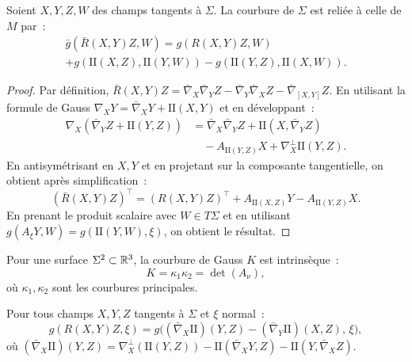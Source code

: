 \begin{theoreme}
\label{thm:gauss}
Soient $X, Y, Z, W$ des champs tangents \`a $\Sigma$. La courbure de $\Sigma$ est
reli\'ee \`a celle de $M$ par~:
\begin{multline*}
    \bar{g}(\bar{R}(X, Y)Z, W) = g(R(X, Y)Z, W) \\
    + g(\mathrm{I\!I}(X, Z), \mathrm{I\!I}(Y, W))
    - g(\mathrm{I\!I}(Y, Z), \mathrm{I\!I}(X, W)).
\end{multline*}
\end{theoreme}

\begin{proof}
Par d\'efinition, $\bar{R}(X,Y)Z = \bar{\nabla}_X \bar{\nabla}_Y Z
- \bar{\nabla}_Y \bar{\nabla}_X Z - \bar{\nabla}_{[X,Y]} Z$. En utilisant la
formule de Gauss $\nabla_X Y = \bar{\nabla}_X Y + \mathrm{I\!I}(X, Y)$ et en
d\'eveloppant~:
\begin{align*}
    \nabla_X(\bar{\nabla}_Y Z + \mathrm{I\!I}(Y,Z))
    &= \bar{\nabla}_X \bar{\nabla}_Y Z + \mathrm{I\!I}(X, \bar{\nabla}_Y Z) \\
    &\quad - A_{\mathrm{I\!I}(Y,Z)} X + \nabla_X^\perp \mathrm{I\!I}(Y,Z).
\end{align*}
En antisym\'etrisant en $X, Y$ et en projetant sur la composante tangentielle,
on obtient apr\`es simplification~:
\[
    (\bar{R}(X,Y)Z)^\top = (R(X,Y)Z)^\top + A_{\mathrm{I\!I}(X,Z)}Y - A_{\mathrm{I\!I}(Y,Z)}X.
\]
En prenant le produit scalaire avec $W \in T\Sigma$ et en utilisant
$g(A_\xi Y, W) = g(\mathrm{I\!I}(Y,W), \xi)$, on obtient le r\'esultat.
\end{proof}

\begin{corollaire}
Pour une surface $\Sigma^2 \subset \mathbb{R}^3$, la courbure de Gauss $K$ est intrins\`eque~:
\[
    K = \kappa_1 \kappa_2 = \det(A_\nu),
\]
o\`u $\kappa_1, \kappa_2$ sont les courbures principales.
\end{corollaire}

\begin{theoreme}
\label{thm:codazzi}
Pour tous champs $X, Y, Z$ tangents \`a $\Sigma$ et $\xi$ normal~:
\[
    g(R(X, Y)Z, \xi) = g\bigl((\bar{\nabla}_X \mathrm{I\!I})(Y, Z)
    - (\bar{\nabla}_Y \mathrm{I\!I})(X, Z),\, \xi\bigr),
\]
o\`u $(\bar{\nabla}_X \mathrm{I\!I})(Y, Z) = \nabla_X^\perp(\mathrm{I\!I}(Y, Z))
- \mathrm{I\!I}(\bar{\nabla}_X Y, Z) - \mathrm{I\!I}(Y, \bar{\nabla}_X Z)$.
\end{theoreme}

